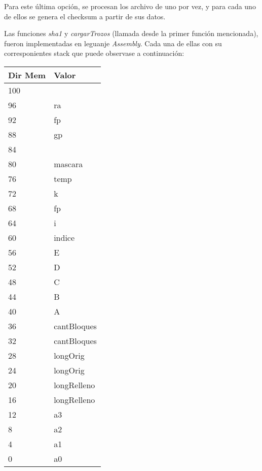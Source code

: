\documentclass[a4paper,10pt]{article}
\begin{document}
Para este última opción, se procesan los archivo de uno por vez, y para cada uno de ellos se genera el checksum a partir de sus datos.

Las funciones \textsl{sha1} y \textsl{cargarTrozos} (llamada desde la primer función mencionada), fueron implementadas en leguanje \textsl{Assembly}. Cada una de ellas con su corresponientes stack que puede observase a continuación:

\begin{center}
    \begin{tabular}{ | p{3cm} | p{3cm}  | }
    \hline
        Dir Mem & Valor \\ \hline
        100 &  \\ \hline
        96 & ra \\ \hline
        92 & fp \\ \hline
        88 & gp \\ \hline
        84 &  \\ \hline
        80 & mascara \\ \hline
        76 & temp \\ \hline
        72 & k \\ \hline
        68 & fp \\ \hline
        64 & i \\ \hline
        60 & indice \\ \hline
        56 & E \\ \hline
        52 & D \\ \hline
        48 & C \\ \hline
        44 & B \\ \hline
        40 & A \\ \hline
        36 & cantBloques \\ \hline
        32 & cantBloques \\ \hline
        28 & longOrig \\ \hline
        24 & longOrig \\ \hline
        20 & longRelleno \\ \hline
        16 & longRelleno \\ \hline
        12 & a3 \\ \hline
        8 & a2 \\ \hline
        4 & a1 \\ \hline
        0 & a0 \\ \hline
        \hline
    \end{tabular}
\end{center}
\end{document}
